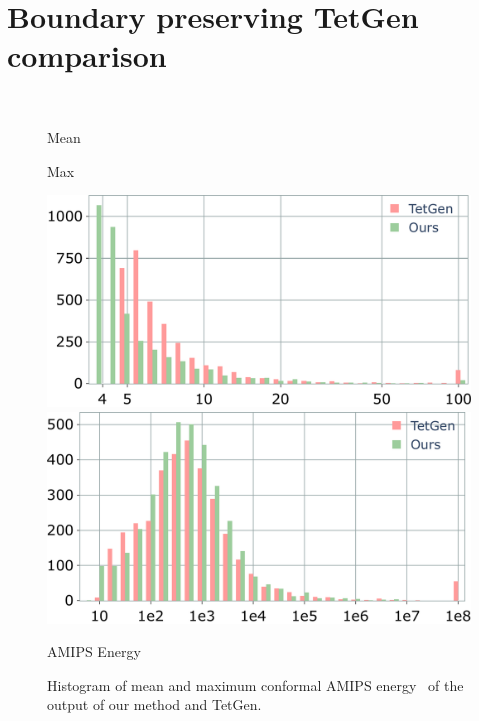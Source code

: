 \section{Boundary preserving TetGen comparison}\label{app:tetgen}

\begin{figure}
    \centering
    \parbox{0.02\linewidth}{~}\hfill\hfill
    \parbox{.47\linewidth}{\centering Mean}\hfill
    \parbox{.47\linewidth}{\centering Max}\par
    \parbox{0.02\linewidth}{\centering{}}\hfill\hfill
    \parbox{.47\linewidth}{\includegraphics[width=\linewidth]{curve_meshing_in_shell_tex/figs/stats/tetgen_meanE}}\hfill
    \parbox{.47\linewidth}{\includegraphics[width=\linewidth]{curve_meshing_in_shell_tex/figs/stats/tetgen_maxE}}\par
     \scriptsize{AMIPS Energy}
    \caption{Histogram of mean and maximum conformal AMIPS energy~\cite{rabinovich2017scalable} of the output of our method and TetGen.}
    \label{bichon:fig:energy-max-avg}
\end{figure}

